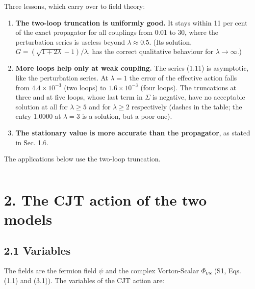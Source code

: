 \documentclass[
  10pt,
]{article}
\providecommand{\tightlist}{%
  \setlength{\itemsep}{0pt}\setlength{\parskip}{0pt}}
\begin{document}
Three lessons, which carry over to field theory:

\begin{enumerate}
\def\labelenumi{\arabic{enumi}.}
\tightlist
\item
  \textbf{The two-loop truncation is uniformly good.} It stays within 11
  per cent of the exact propagator for all couplings from 0.01 to 30,
  where the perturbation series is useless beyond \(\lambda\approx0.5\).
  (Its solution, \(G=(\sqrt{1+2\lambda}-1)/\lambda\), has the correct
  qualitative behaviour for \(\lambda\to\infty\).)
\item
  \textbf{More loops help only at weak coupling.} The series (1.11) is
  asymptotic, like the perturbation series. At \(\lambda=1\) the error
  of the effective action falls from \(4.4\times10^{-3}\) (two loops) to
  \(1.6\times10^{-3}\) (four loops). The truncations at three and at
  five loops, whose last term in \(\Sigma\) is negative, have no
  acceptable solution at all for \(\lambda\ge5\) and for \(\lambda\ge2\)
  respectively (dashes in the table; the entry 1.0000 at \(\lambda=3\)
  is a solution, but a poor one).
\item
  \textbf{The stationary value is more accurate than the propagator}, as
  stated in Sec. 1.6.
\end{enumerate}

The applications below use the two-loop truncation.

\begin{center}\rule{0.5\linewidth}{0.5pt}\end{center}

\hypertarget{the-cjt-action-of-the-two-models}{%
\section{2. The CJT action of the two
models}\label{the-cjt-action-of-the-two-models}}

\hypertarget{variables}{%
\subsection{2.1 Variables}\label{variables}}

The fields are the fermion field \(\psi\) and the complex Vorton-Scalar
\(\Phi_{VS}\) (S1, Eqs. (1.1) and (3.1)). The variables of the CJT
action are:
\end{document}
